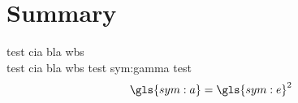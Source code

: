 \section*{Summary}\label{cha:summary}
test \gls{cia} bla \gls{wbs} \\ test \gls{cia} bla \gls{wbs} test \gls{sym:gamma} test 
\begin{equation}
\gls{sym:a} = \gls{sym:e}^2
\end{equation}
